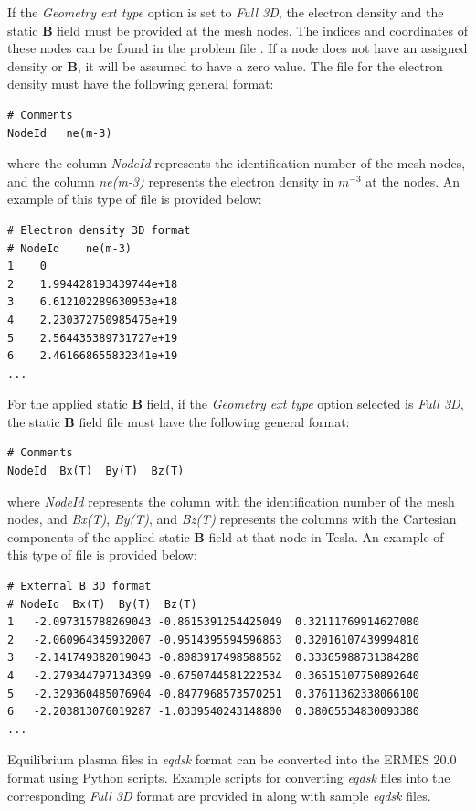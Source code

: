 If the \emph{Geometry ext type} option is set to \textit{Full 3D}, the electron density and the static \textbf{B} field must be provided at the mesh nodes. The indices and coordinates of these nodes can be found in the problem file . If a node does not have an assigned density or \textbf{B}, it will be assumed to have a zero value. The file for the electron density must have the following general format:
\begin{small}\begin{lstlisting}
# Comments	 
NodeId   ne(m-3) 
\end{lstlisting}\end{small} 
where the column \textit{NodeId} represents the identification number of the mesh nodes, and the column \textit{ne(m-3)} represents the electron density in $m^{-3}$ at the nodes. An example of this type of file is provided below:
\begin{small}\begin{lstlisting}
# Electron density 3D format
# NodeId    ne(m-3)
1    0
2    1.994428193439744e+18
3    6.612102289630953e+18
4    2.230372750985475e+19
5    2.564435389731727e+19
6    2.461668655832341e+19
...
\end{lstlisting}\end{small} 
For the applied static \textbf{B} field, if the \emph{Geometry ext type} option selected is \textit{Full 3D}, the static \textbf{B} field file must have the following general format:
\begin{small}\begin{lstlisting}
# Comments	 
NodeId  Bx(T)  By(T)  Bz(T)
\end{lstlisting}\end{small} 
where \textit{NodeId} represents the column with the identification number of the mesh nodes, and \textit{Bx(T)}, \textit{By(T)}, and \textit{Bz(T)} represents the columns with the Cartesian components of the applied static \textbf{B} field at that node in Tesla. An example of this type of file is provided below:
\begin{small}\begin{lstlisting}
# External B 3D format
# NodeId  Bx(T)  By(T)  Bz(T)
1   -2.097315788269043 -0.8615391254425049  0.32111769914627080
2   -2.060964345932007 -0.9514395594596863  0.32016107439994810
3   -2.141749382019043 -0.8083917498588562  0.33365988731384280
4   -2.279344797134399 -0.6750744581222534  0.36515107750892640
5   -2.329360485076904 -0.8477968573570251  0.37611362338066100
6   -2.203813076019287 -1.0339540243148800  0.38065534830093380
...
\end{lstlisting}\end{small} 
Equilibrium plasma files in \textit{eqdsk} format can be converted into the ERMES 20.0 format using Python scripts. Example scripts for converting \textit{eqdsk} files into the corresponding \textit{Full 3D} format are provided in  along with sample \textit{eqdsk} files.

